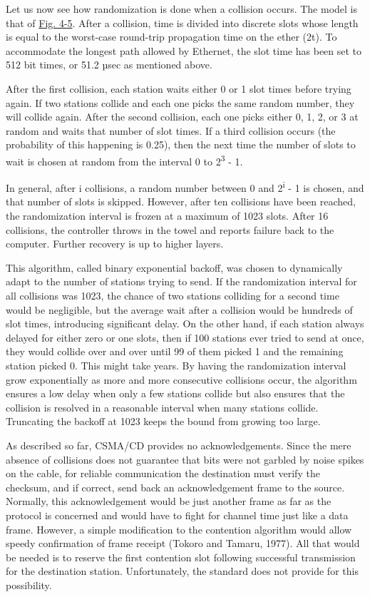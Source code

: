 \documentclass[b5paper,11pt]{memoir}
\begin{document}
Let us now see how randomization is done when a collision occurs. The
model is that of
\protect\hyperlink{0130661023_ch04lev1sec2.htmlux5cux23ch04fig05}{Fig.
4-5}. After a collision, time is divided into discrete slots whose
length is equal to the worst-case round-trip propagation time on the
ether (2{t}). To accommodate the longest path allowed by Ethernet, the
slot time has been set to 512 bit times, or 51.2 µsec as mentioned
above.

After the first collision, each station waits either 0 or 1 slot times
before trying again. If two stations collide and each one picks the same
random number, they will collide again. After the second collision, each
one picks either 0, 1, 2, or 3 at random and waits that number of slot
times. If a third collision occurs (the probability of this happening is
0.25), then the next time the number of slots to wait is chosen at
random from the interval 0 to 2\textsuperscript{3} - 1.

In general, after {i} collisions, a random number between 0 and
2{\textsuperscript{i}} - 1 is chosen, and that number of slots is
skipped. However, after ten collisions have been reached, the
randomization interval is frozen at a maximum of 1023 slots. After 16
collisions, the controller throws in the towel and reports failure back
to the computer. Further recovery is up to higher layers.

This algorithm, called {binary exponential backoff}, was chosen to
dynamically adapt to the number of stations trying to send. If the
randomization interval for all collisions was 1023, the chance of two
stations colliding for a second time would be negligible, but the
average wait after a collision would be hundreds of slot times,
introducing significant delay. On the other hand, if each station always
delayed for either zero or one slots, then if 100 stations ever tried to
send at once, they would collide over and over until 99 of them picked 1
and the remaining station picked 0. This might take years. By having the
randomization interval grow exponentially as more and more consecutive
collisions occur, the algorithm ensures a low delay when only a few
stations collide but also ensures that the collision is resolved in a
reasonable interval when many stations collide. Truncating the backoff
at 1023 keeps the bound from growing too large.

As described so far, CSMA/CD provides no acknowledgements. Since the
mere absence of collisions does not guarantee that bits were not garbled
by noise spikes on the cable, for reliable communication the destination
must verify the checksum, and if correct, send back an acknowledgement
frame to the source. Normally, this acknowledgement would be just
another frame as far as the protocol is concerned and would have to
fight for channel time just like a data frame. However, a simple
modification to the contention algorithm would allow speedy confirmation
of frame receipt (Tokoro and Tamaru, 1977). All that would be needed is
to reserve the first contention slot following successful transmission
for the destination station. Unfortunately, the standard does not
provide for this possibility.
\end{document}
